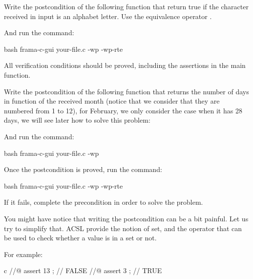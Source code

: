 


Write the postcondition of the following function that return true if
the character received in input is an alphabet letter. Use the equivalence
operator \CodeInline{<==>}.





And run the command:


\begin{CodeBlock}{bash}
frama-c-gui your-file.c -wp -wp-rte
\end{CodeBlock}


All verification conditions should be proved, including the assertions in the
main function.






Write the postcondition of the following function that returns the number
of days in function of the received month (notice that we consider that
they are numbered from 1 to 12), for February, we only consider the case
when it has 28 days, we will see later how to solve this problem:





And run the command:


\begin{CodeBlock}{bash}
frama-c-gui your-file.c -wp
\end{CodeBlock}


Once the postcondition is proved, run the command:



\begin{CodeBlock}{bash}
frama-c-gui your-file.c -wp -wp-rte
\end{CodeBlock}



If it fails, complete the precondition in order to solve the problem.



You might have notice that writing the postcondition can be a bit painful.
Let us try to simplify that. ACSL provide the notion of set, and the operator
 that can be used to check whether a value is
in a set or not.


For example:


\begin{CodeBlock}{c}
//@ assert 13  ; // FALSE
//@ assert 3   ; // TRUE
\end{CodeBlock}



